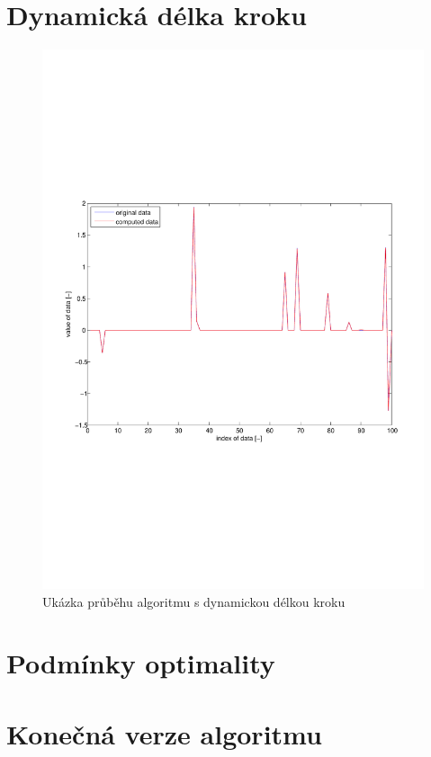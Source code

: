 \documentclass[FM,BP]{tulthesis}
\begin{document}
\section{Dynamická délka kroku}
\begin{figure}[!h]
\begin{center}
\includegraphics[scale=0.5]{obr/dynamic.pdf}
\end{center}
\caption{Ukázka průběhu algoritmu s dynamickou délkou kroku}
\label{fig:dynamicAlpha}
\end{figure}

\section{Podmínky optimality}

\section{Konečná verze algoritmu}
\end{document}

